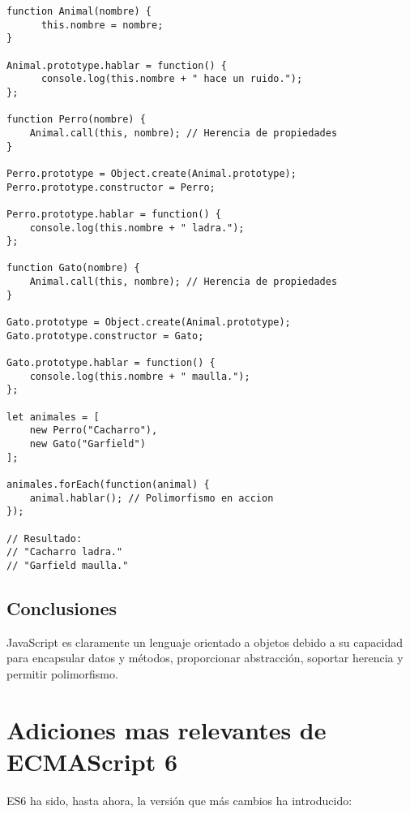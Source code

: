 \documentclass{article}
\begin{document}
\begin{lstlisting}
function Animal(nombre) {
      this.nombre = nombre;
}
      
Animal.prototype.hablar = function() {
      console.log(this.nombre + " hace un ruido.");
};

function Perro(nombre) {
    Animal.call(this, nombre); // Herencia de propiedades
}

Perro.prototype = Object.create(Animal.prototype);
Perro.prototype.constructor = Perro;

Perro.prototype.hablar = function() {
    console.log(this.nombre + " ladra.");
};

function Gato(nombre) {
    Animal.call(this, nombre); // Herencia de propiedades
}

Gato.prototype = Object.create(Animal.prototype);
Gato.prototype.constructor = Gato;

Gato.prototype.hablar = function() {
    console.log(this.nombre + " maulla.");
};

let animales = [
    new Perro("Cacharro"),
    new Gato("Garfield")
];

animales.forEach(function(animal) {
    animal.hablar(); // Polimorfismo en accion
});

// Resultado:
// "Cacharro ladra."
// "Garfield maulla."

\end{lstlisting}

\subsection{Conclusiones}

JavaScript es claramente un lenguaje orientado a objetos debido a su 
capacidad para encapsular datos y métodos, proporcionar abstracción, 
soportar herencia y permitir polimorfismo.

\section{Adiciones mas relevantes de ECMAScript 6}

ES6 ha sido, hasta ahora, la versión que más cambios ha introducido:
\end{document}

